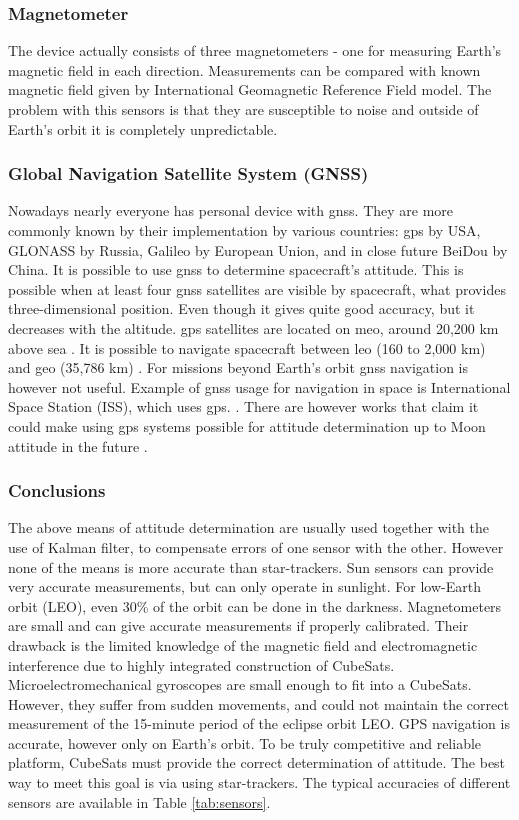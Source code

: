 \documentclass[12pt,a4paper,oneside]{article}
\begin{document}
\subsubsection{Magnetometer}
The device actually consists of three magnetometers - one for measuring Earth's magnetic field in each direction. Measurements can be compared with known magnetic field given by International Geomagnetic Reference Field model. The problem with this sensors is that they are susceptible to noise and outside of Earth's orbit it is completely unpredictable.
\subsubsection{Global Navigation Satellite System (GNSS)}
Nowadays nearly everyone has personal device with \gls{gnss}. They are more commonly known by their implementation by various countries: \gls{gps} by USA, GLONASS by Russia, Galileo by European Union, and in close future BeiDou by China. It is possible to use \gls{gnss} to determine spacecraft's attitude. This is possible when at least four \gls{gnss} satellites are visible by spacecraft, what provides three-dimensional position. Even though it gives quite good accuracy, but it decreases with the altitude. \gls{gps} satellites are located on \gls{meo}, around 20,200 km above sea \cite{gps-gov}. It is possible to navigate spacecraft between \gls{leo} (160 to 2,000 km) and \gls{geo} (35,786 km) \cite{nasa-gps-navigation}. For missions beyond Earth's orbit \gls{gnss} navigation is however not useful. Example of \gls{gnss} usage for navigation in space is International Space Station (ISS), which uses \gls{gps}. \cite{iss-gps}. There are however works that claim it could make using \gls{gps} systems possible for attitude determination up to Moon attitude in the future \cite{capuano2014gnss}.

\subsubsection{Conclusions}
The above means of attitude determination are usually used together with the use of Kalman filter, to compensate errors of one sensor with the other. However none of the means is more accurate than star-trackers.
Sun sensors can provide very accurate measurements, but can only operate in sunlight. For low-Earth orbit (LEO), even 30\% of the orbit can be done in the darkness. Magnetometers are small and can give accurate measurements if properly calibrated. Their drawback is the limited knowledge of the magnetic field and electromagnetic interference due to highly integrated construction of CubeSats.
Microelectromechanical gyroscopes are small enough to fit into a CubeSats. However, they suffer from sudden movements, and could not maintain the correct measurement of the 15-minute period of the eclipse orbit LEO. GPS navigation is accurate, however only on Earth's orbit. To be truly competitive and reliable platform, CubeSats must provide the correct determination of attitude. The best way to meet this goal is via using star-trackers. The typical accuracies of different sensors are available in Table \ref{tab:sensors}.
\end{document}
